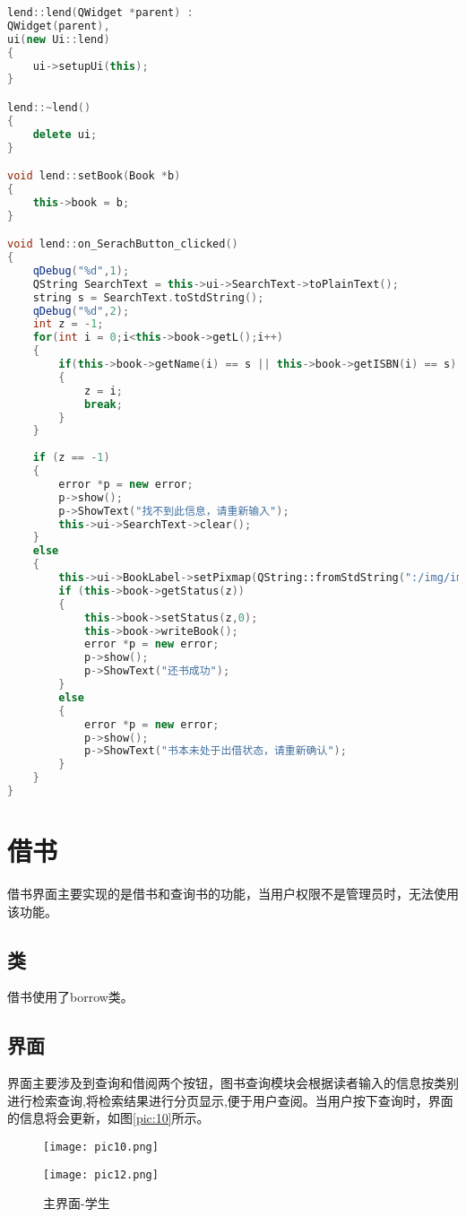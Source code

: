 \documentclass[forprint]{shmtu}
\begin{document}
\begin{lstlisting}[language=C++]
lend::lend(QWidget *parent) :
QWidget(parent),
ui(new Ui::lend)
{
	ui->setupUi(this);
}

lend::~lend()
{
	delete ui;
}

void lend::setBook(Book *b)
{
	this->book = b;
}

void lend::on_SerachButton_clicked()
{
	qDebug("%d",1);
	QString SearchText = this->ui->SearchText->toPlainText();
	string s = SearchText.toStdString();
	qDebug("%d",2);
	int z = -1;
	for(int i = 0;i<this->book->getL();i++)
	{
		if(this->book->getName(i) == s || this->book->getISBN(i) == s)
		{
			z = i;
			break;
		}
	}
	
	if (z == -1)
	{
		error *p = new error;
		p->show();
		p->ShowText("找不到此信息，请重新输入");
		this->ui->SearchText->clear();
	}
	else
	{
		this->ui->BookLabel->setPixmap(QString::fromStdString(":/img/img/book/" + this->book->getISBN(z) +".jpg"));
		if (this->book->getStatus(z))
		{
			this->book->setStatus(z,0);
			this->book->writeBook();
			error *p = new error;
			p->show();
			p->ShowText("还书成功");
		}
		else
		{
			error *p = new error;
			p->show();
			p->ShowText("书本未处于出借状态，请重新确认");
		}
	}
}
\end{lstlisting}

\section{借书}

借书界面主要实现的是借书和查询书的功能，当用户权限不是管理员时，无法使用该功能。

\subsection{类}

借书使用了borrow类。

\subsection{界面}

界面主要涉及到查询和借阅两个按钮，图书查询模块会根据读者输入的信息按类别进行检索查询,将检索结果进行分页显示,便于用户查阅。当用户按下查询时，界面的信息将会更新，如图\ref{pic:10}所示。

\begin{figure}[!htbp]
	\centering
	\begin{minipage}[!htbp]{0.45\linewidth}
		\centering
		\texttt{[image: pic10.png]}
		\caption{借书界面}
		\label{pic:10}
	\end{minipage}%
	\begin{minipage}[!htbp]{0.45\linewidth}
		\centering
		\texttt{[image: pic12.png]}
		\caption{主界面-学生}
		\label{pic:12}
	\end{minipage}%
\end{figure}
\end{document}
